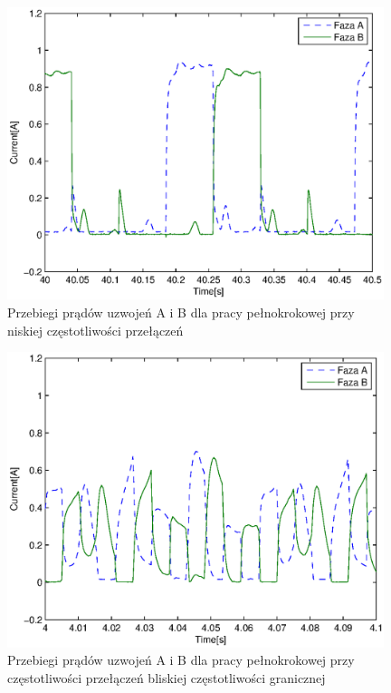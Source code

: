 \documentclass[12pt]{article}
\begin{document}
\begin{figure}[!htb]
	\begin{center}
		\includegraphics[width=11cm]{../res/img/pel_wol.eps}
	\end{center}
	\caption{Przebiegi prądów uzwojeń A i B dla pracy pełnokrokowej przy niskiej
	częstotliwości przełączeń}
\end{figure}
\begin{figure}[!htb]
	\begin{center}
		\includegraphics[width=11cm]{../res/img/pel_szyb.eps}
	\end{center}
	\caption{Przebiegi prądów uzwojeń A i B dla pracy pełnokrokowej przy
	częstotliwości przełączeń bliskiej częstotliwości granicznej}
\end{figure}
\end{document}
